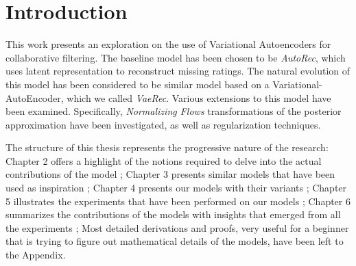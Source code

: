 \chapter{Introduction}

This work presents an exploration on the use of Variational Autoencoders for collaborative
filtering. The baseline model has been chosen to be \emph{AutoRec}\cite{Sedhain2015},
which uses latent representation to reconstruct missing ratings.
The natural evolution of this model has been considered to be similar
model based on a Variational-AutoEncoder, which we called \emph{VaeRec}.
Various extensions to this model have been examined.
Specifically, \emph{Normalizing Flows} transformations of the posterior approximation 
have been investigated, as well as regularization techniques.

The structure of this thesis represents the progressive nature of the research:
Chapter 2 offers a highlight of the notions required to delve into the 
actual contributions of the model ;
Chapter 3 presents similar models that have been used as inspiration ;
Chapter 4 presents our models with their variants ;
Chapter 5 illustrates the experiments that have been performed on our models ;
Chapter 6 summarizes the contributions of the models with insights that emerged from all the experiments ;
Most detailed derivations and proofs, very useful for a beginner that is trying to figure
out mathematical details of the models, have been left to the Appendix.

